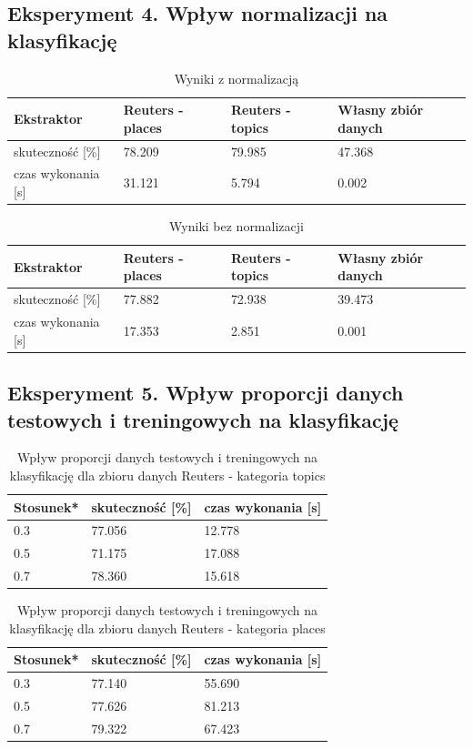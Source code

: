 \documentclass{classrep}
\begin{document}
\subsection{Eksperyment 4. Wpływ normalizacji na klasyfikację}
\begin{table}[H]
	\caption{Wyniki z normalizacją}
	\begin{tabular}{l|l|l|l}
		Ekstraktor& Reuters - places & Reuters - topics & Własny zbiór danych\\
		\hline
		skuteczność [\%]   &78.209&79.985&47.368\\
		czas wykonania [s] &31.121&5.794&0.002\\
	\end{tabular}
\end{table}

\begin{table}[H]
	\caption{Wyniki bez normalizacji}
	\begin{tabular}{l|l|l|l}
		Ekstraktor& Reuters - places & Reuters - topics & Własny zbiór danych\\
		\hline
		skuteczność [\%]   &77.882&72.938&39.473\\
		czas wykonania [s] &17.353&2.851&0.001\\
	\end{tabular}
\end{table}

\subsection{Eksperyment 5. Wpływ proporcji danych testowych i treningowych na klasyfikację}
\begin{table}[H]
	\centering
	\caption{Wpływ proporcji danych testowych i treningowych na klasyfikację dla zbioru danych Reuters - kategoria topics}
	\begin{tabular}{l|l|l}
		Stosunek* & skuteczność [\%] & czas wykonania [s]\\
		\hline
		0.3&77.056&12.778\\
		0.5&71.175&17.088\\
		0.7&78.360&15.618\\
	\end{tabular}
\end{table}

\begin{table}[H]
	\centering
	\caption{Wpływ proporcji danych testowych i treningowych na klasyfikację dla zbioru danych Reuters - kategoria places}
	\begin{tabular}{l|l|l}
		Stosunek*& skuteczność [\%] & czas wykonania [s]\\
		\hline
		0.3&77.140&55.690\\
		0.5&77.626&81.213\\
		0.7&79.322&67.423\\
	\end{tabular}
\end{table}
\end{document}
